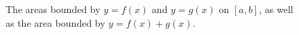 \begin{enumerate}[1)]
\begin{figure}
\begin{flushright}
\hspace{.25cm}
\caption{The areas bounded by $y = f(x)$ and $y = g(x)$ on $[a,b]$, as well as the area bounded by $y = f(x) + g(x)$.}
\label{fig:4-3_Sum}
\end{flushright}
\end{figure}
\end{enumerate}

